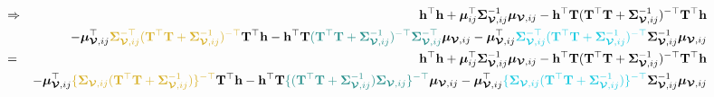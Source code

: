 \documentclass[12pt]{article}
\newcommand{\0}{\mathbf{0}}
\begin{document}
\begin{eqnarray*}
& \Rightarrow & \mathbf{h}^{\top} \mathbf{h} + \boldsymbol{\mu}_{ij}^{\top} \boldsymbol{\Sigma}_{\boldsymbol{\mathcal{V}}, ij}^{-1} \boldsymbol{\mu}_{\boldsymbol{\mathcal{V}}, ij} -  \mathbf{h}^{\top} \mathbf{T} ( \mathbf{T}^{\top} \mathbf{T} + \boldsymbol{\Sigma}_{\boldsymbol{\mathcal{V}}, ij}^{-1} )^{-\top} \mathbf{T}^{\top} \mathbf{h} \\
&& - \boldsymbol{\mu}_{\boldsymbol{\mathcal{V}}, ij}^{\top}  \textcolor{gold}{  \boldsymbol{\Sigma}_{\boldsymbol{\mathcal{V}}, ij}^{-\top}  ( \mathbf{T}^{\top} \mathbf{T} + \boldsymbol{\Sigma}_{\boldsymbol{\mathcal{V}}, ij}^{-1} )^{-\top} } \mathbf{T}^{\top} \mathbf{h}  -  \mathbf{h}^{\top} \mathbf{T} \textcolor{kaustgreen}{ ( \mathbf{T}^{\top} \mathbf{T} + \boldsymbol{\Sigma}_{\boldsymbol{\mathcal{V}}, ij}^{-1} )^{-\top} \boldsymbol{\Sigma}_{\boldsymbol{\mathcal{V}}, ij}^{-\top}} \boldsymbol{\mu}_{\boldsymbol{\mathcal{V}}, ij}  -  \boldsymbol{\mu}_{\boldsymbol{\mathcal{V}}, ij}^{\top} \textcolor{lightblue}{  \boldsymbol{\Sigma}_{\boldsymbol{\mathcal{V}}, ij}^{-\top}  ( \mathbf{T}^{\top} \mathbf{T} + \boldsymbol{\Sigma}_{\boldsymbol{\mathcal{V}}, ij}^{-1} )^{-\top} } \boldsymbol{\Sigma}_{\boldsymbol{\mathcal{V}}, ij}^{-1}\boldsymbol{\mu}_{\boldsymbol{\mathcal{V}}, ij} \\
& = & \mathbf{h}^{\top} \mathbf{h} + \boldsymbol{\mu}_{ij}^{\top} \boldsymbol{\Sigma}_{\boldsymbol{\mathcal{V}}, ij}^{-1} \boldsymbol{\mu}_{\boldsymbol{\mathcal{V}}, ij}  -  \mathbf{h}^{\top} \mathbf{T} ( \mathbf{T}^{\top} \mathbf{T} + \boldsymbol{\Sigma}_{\boldsymbol{\mathcal{V}}, ij}^{-1} )^{-\top} \mathbf{T}^{\top} \mathbf{h} \\
&& - \boldsymbol{\mu}_{\boldsymbol{\mathcal{V}}, ij}^{\top}   \textcolor{gold}{ \{ \boldsymbol{\Sigma}_{\boldsymbol{\mathcal{V}}, ij} ( \mathbf{T}^{\top} \mathbf{T} + \boldsymbol{\Sigma}_{\boldsymbol{\mathcal{V}}, ij}^{-1} ) \}^{-\top}} \mathbf{T}^{\top} \mathbf{h} -  \mathbf{h}^{\top} \mathbf{T} \textcolor{kaustgreen}{ \{ ( \mathbf{T}^{\top} \mathbf{T} + \boldsymbol{\Sigma}_{\boldsymbol{\mathcal{V}}, ij}^{-1} ) \boldsymbol{\Sigma}_{\boldsymbol{\mathcal{V}}, ij} \}^{-\top}} \boldsymbol{\mu}_{\boldsymbol{\mathcal{V}}, ij}  -  \boldsymbol{\mu}_{\boldsymbol{\mathcal{V}}, ij}^{\top} \textcolor{lightblue}{ \{ \boldsymbol{\Sigma}_{\boldsymbol{\mathcal{V}}, ij} ( \mathbf{T}^{\top} \mathbf{T} + \boldsymbol{\Sigma}_{\boldsymbol{\mathcal{V}}, ij}^{-1} ) \}^{-\top}} \boldsymbol{\Sigma}_{\boldsymbol{\mathcal{V}}, ij}^{-1}\boldsymbol{\mu}_{\boldsymbol{\mathcal{V}}, ij} 
\end{eqnarray*}
\end{document}
